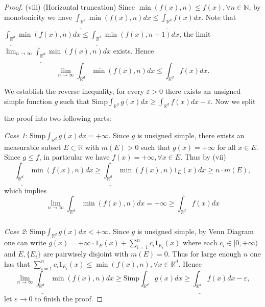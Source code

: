 \documentclass[a4paper]{article}
\begin{document}
\begin{proof}
(viii) (Horizontal truncation) Since $\min(f(x), n) \leq  f(x), \forall n \in \mathbb{N}$, by monotonicity we have
$\underline{\int_{\mathbb{R}^d}} \min(f(x),n) dx \leq \underline{\int_{\mathbb{R}^d}}f(x) dx$. Note that 
$\underline{\int_{\mathbb{R}^d}} \min(f(x),n) dx \leq \underline{\int_{\mathbb{R}^d}} \min(f(x),n + 1) dx$, the limit
$\lim_{n\to \infty}\underline{\int_{\mathbb{R}^d}} \min(f(x),n) dx$ exists. Hence $$
\lim_{n \to \infty} \underline{\int_{\mathbb{R}^d}} \min(f(x),n) dx \leq 
\underline{\int_{\mathbb{R}^d}} f(x) dx.
$$ We establish the reverse inequality, for every $\varepsilon > 0$ there exists an unsigned simple function $g$
such that $\mathrm{Simp}\int_{\mathbb{R}^d} g(x) dx \geq \underline{\int_{\mathbb{R}^d}}f(x) dx - \varepsilon$.
Now we split the proof into two following parts:

\emph{Case 1}: $\mathrm{Simp}\int_{\mathbb{R}^d} g(x) dx = +\infty$. Since $g$ is unsigned simple, there exists an 
measurable subset $E \subset \mathbb{R}$ with $m(E) > 0$ such that $g(x) = +\infty$ for all $x \in E$. Since $g \leq f$, 
in particular we have $f(x) = +\infty, \forall x \in E$.
Thus by (vii) $$
\underline{\int_{\mathbb{R}^d}}\min(f(x), n) dx \geq \underline{\int_{\mathbb{R}^d}} \min(f(x),n)1_E(x) dx \geq 
n \cdot m(E),
$$which implies$$
\lim_{n \to \infty} \underline{\int_{\mathbb{R}^d}} \min(f(x),n) dx = +\infty \geq \underline{\int_{\mathbb{R}^d}} f(x) dx
$$

\emph{Case 2}: $\mathrm{Simp}\int_{\mathbb{R}^d} g(x) dx < +\infty$. Since $g$ is unsigned simple, by Venn Diagram
one can write $g(x) = +\infty \cdot 1_E(x) + \sum_{i = 1}^n c_i 1_{E_i}(x)$ where each $c_i \in [0, +\infty)$ and 
$E, \{E_i\}$ are pairwisely disjoint with $m(E) = 0$. Thus for large enough $n$ one has that $\sum_{i = 1}^n c_i 1_{E_i}(x)
\leq \min(f(x), n), \forall x \in \mathbb{R}^d$. Hence $$
\lim_{n \to \infty} \underline{\int_{\mathbb{R}^d}} \min(f(x),n) dx \geq \mathrm{Simp}\int_{\mathbb{R}^d} g(x) dx
\geq \underline{\int_{\mathbb{R}^d}} f(x) dx - \varepsilon,
$$let $\varepsilon \to 0$ to finish the proof.


\end{proof}
\end{document}
